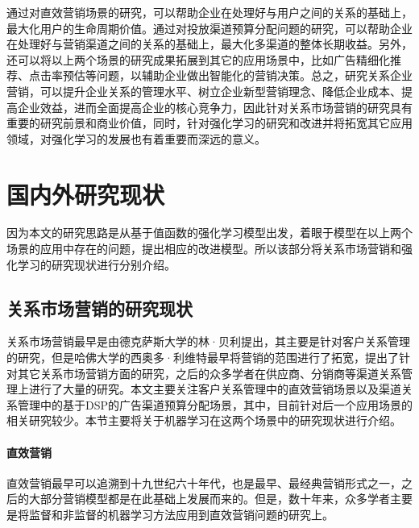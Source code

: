 通过对直效营销场景的研究，可以帮助企业在处理好与用户之间的关系的基础上，最大化用户的生命周期价值。通过对投放渠道预算分配问题的研究，可以帮助企业在处理好与营销渠道之间的关系的基础上，最大化多渠道的整体长期收益。另外，
还可以将以上两个场景的研究成果拓展到其它的应用场景中，比如广告精细化推荐、点击率预估等问题，以辅助企业做出智能化的营销决策。总之，研究关系企业营销，可以提升企业关系的管理水平、树立企业新型营销理念、降低企业成本、提高企业效益，进而全面提高企业的核心竞争力，因此针对关系市场营销的研究具有重要的研究前景和商业价值，同时，针对强化学习的研究和改进并将拓宽其它应用领域，对强化学习的发展也有着重要而深远的意义。

\section{国内外研究现状}
因为本文的研究思路是从基于值函数的强化学习模型出发，着眼于模型在以上两个场景的应用中存在的问题，提出相应的改进模型。所以该部分将关系市场营销和强化学习的研究现状进行分别介绍。

\subsection{关系市场营销的研究现状}
关系市场营销最早是由德克萨斯大学的林·贝利提出，其主要是针对客户关系管理的研究，但是哈佛大学的西奥多·利维特最早将营销的范围进行了拓宽，提出了针对其它关系市场营销方面的研究，之后的众多学者在供应商、分销商等渠道关系管理上进行了大量的研究。本文主要关注客户关系管理中的直效营销场景以及渠道关系管理中的基于DSP的广告渠道预算分配场景，其中，目前针对后一个应用场景的相关研究较少。本节主要将关于机器学习在这两个场景中的研究现状进行介绍。


\paragraph{直效营销}
直效营销最早可以追溯到十九世纪六十年代，也是最早、最经典营销形式之一，之后的大部分营销模型都是在此基础上发展而来的。但是，数十年来，众多学者主要是将监督和非监督的机器学习方法应用到直效营销问题的研究上。

